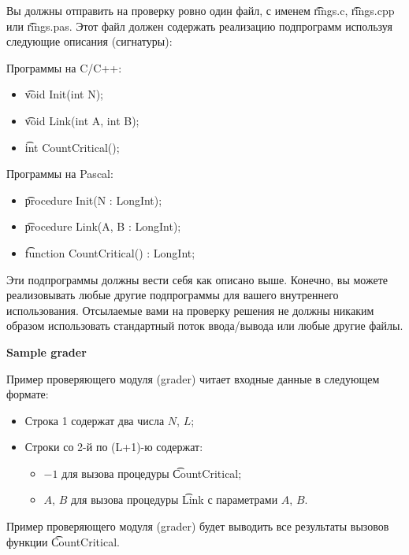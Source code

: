 Вы должны отправить на проверку ровно один файл, с именем \t{rings.c}, \t{rings.cpp} или \t{rings.pas}. Этот файл должен содержать реализацию подпрограмм используя следующие описания (сигнатуры):

Программы на C/C++:

\begin{itemize}
\item \t{void Init(int N);}
\item \t{void Link(int A, int B);}
\item \t{int CountCritical();}
\end{itemize}

Программы на Pascal:

\begin{itemize}
\item \t{procedure Init(N : LongInt);}
\item \t{procedure Link(A, B : LongInt);}
\item \t{function CountCritical() : LongInt;}
\end{itemize}

Эти подпрограммы должны вести себя как описано выше. Конечно, вы можете реализовывать любые другие подпрограммы для вашего внутреннего использования. Отсылаемые вами на проверку решения не должны никаким образом использовать стандартный поток ввода/вывода или любые другие файлы. 

\bf{Sample grader}

Пример проверяющего модуля (grader) читает входные данные в следующем формате:
\begin{itemize}
\item Строка 1 содержат два числа $N$, $L$;
\item Строки со 2-й по (L+1)-ю содержат:
\begin{itemize}
\item $-1$ для вызова процедуры \t{CountCritical};
\item $A$, $B$ для вызова процедуры \t{Link} с параметрами $A$, $B$.
\end{itemize} \end{itemize}
Пример проверяющего модуля (grader) будет выводить все результаты вызовов функции \t{CountCritical}.